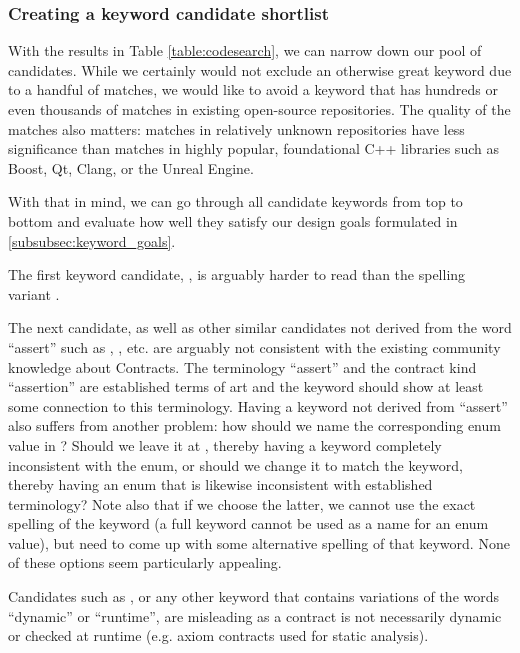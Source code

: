 
\subsubsection{Creating a keyword candidate shortlist}

With the results in Table \ref{table:codesearch}, we can narrow down our pool of candidates. While we certainly would not exclude an otherwise great keyword due to a handful of matches, we would like to avoid a keyword that has hundreds or even thousands of matches in existing open-source repositories. The quality of the matches also matters: matches in relatively unknown repositories have less significance than matches in highly popular, foundational C++ libraries such as Boost, Qt, Clang, or the Unreal Engine.

With that in mind, we can go through all candidate keywords from top to bottom and evaluate how well they satisfy our design goals formulated in \ref{subsubsec:keyword_goals}.

The first keyword candidate, , is arguably harder to read than the spelling variant \mbox{}.

The next candidate,  as well as other similar candidates not derived from the word ``assert'' such as , , etc. are arguably not consistent with the existing community knowledge about Contracts. The terminology ``assert'' and the contract kind ``assertion'' are established terms of art and the keyword should show at least some connection to this terminology. Having a keyword not derived from ``assert'' also suffers from another problem: how should we name the corresponding enum value in \mbox{}? Should we leave it at , thereby having a keyword completely inconsistent with the enum, or should we change it to match the keyword, thereby having an enum that is likewise inconsistent with established terminology? Note also that if we choose the latter, we cannot use the exact spelling of the keyword (a full keyword cannot be used as a name for an enum value), but need to come up with some alternative spelling of that keyword. None of these options seem particularly appealing.

Candidates such as , or any other keyword that contains variations of the words ``dynamic'' or ``runtime'', are misleading as a contract is not necessarily dynamic or checked at runtime (e.g. axiom contracts used for static analysis).

